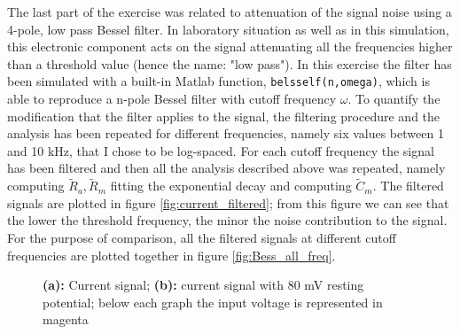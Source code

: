 \documentclass[a4paper]{article}
\begin{document}
The last part of the exercise was related to attenuation of the signal noise using a 4-pole, low pass Bessel filter.
In laboratory situation as well as in this simulation, this electronic component acts on the signal attenuating all the frequencies higher than a threshold value (hence the name: "low pass").
In this exercise the filter has been simulated with a built-in Matlab function, \lstinline{belsself(n,omega)}, which is able to reproduce a n-pole Bessel filter with cutoff frequency $\omega.$
To quantify the modification that the filter applies to the signal, the filtering procedure and the analysis has been repeated for different frequencies, namely six values between 1 and 10 kHz, that I chose to be log-spaced.
For each cutoff frequency the signal has been filtered and then all the analysis described above was repeated, namely computing $\tilde{R}_a, \tilde{R}_m$ fitting the exponential decay and computing $\tilde{C}_m.$
The filtered signals are plotted in figure \ref{fig:current_filtered}; from this figure we can see that the lower the threshold frequency, the minor the noise contribution to the signal.
For the purpose of comparison, all the filtered signals at different cutoff frequencies are plotted together in figure \ref{fig:Bess_all_freq}.




\begin{figure}
\centering
{}
\caption{\textbf{(a):} Current signal; \textbf{(b):} current signal with 80 mV resting potential; below each graph the input voltage is represented in magenta}
\end{figure}
\end{document}
